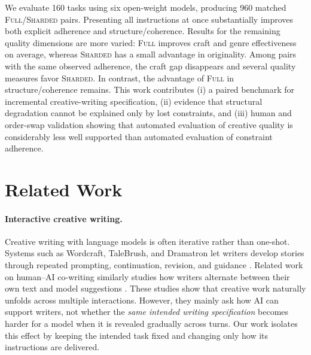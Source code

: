 \documentclass{article}
\begin{document}
We evaluate 160 tasks using six open-weight models, producing 960 matched \textsc{Full}/\textsc{Sharded} pairs. Presenting all instructions at once substantially improves both explicit adherence and structure/coherence. Results for the remaining quality dimensions are more varied: \textsc{Full} improves craft and genre effectiveness on average, whereas \textsc{Sharded} has a small advantage in originality. Among pairs with the same observed adherence, the craft gap disappears and several quality measures favor \textsc{Sharded}. In contrast, the advantage of \textsc{Full} in structure/coherence remains. This work contributes (i) a paired benchmark for incremental creative-writing specification, (ii) evidence that structural degradation cannot be explained only by lost constraints, and (iii) human and order-swap validation showing that automated evaluation of creative quality is considerably less well supported than automated evaluation of constraint adherence.

\section{Related Work}

\paragraph{Interactive creative writing.}Creative writing with language models is often iterative rather than one-shot. Systems such as Wordcraft, TaleBrush, and Dramatron let writers develop stories through repeated prompting, continuation, revision, and guidance \citep{coenen2021wordcrafthumanaicollaborativeeditor,chung2022talebrush, mirowski2022cowritingscreenplaystheatrescripts}. Related work on human--AI co-writing similarly studies how writers alternate between their own text and model suggestions \citep{Lee_2022}. These studies show that creative work naturally unfolds across multiple interactions. However, they mainly ask how AI can support writers, not whether the \emph{same intended writing specification} becomes harder for a model when it is revealed gradually across turns. Our work isolates this effect by keeping the intended task fixed and changing only how its instructions are delivered.
\end{document}
